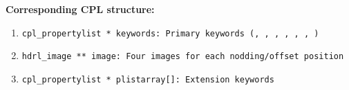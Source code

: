 \begin{datastructdef}
\textbf{Corresponding \ac{CPL} structure:}
\begin{enumerate}
    \item \texttt{cpl\_propertylist * keywords: Primary keywords (\hyperref[fits:dpr.catg]{},  \hyperref[fits:dpr.tech]{},  \hyperref[fits:dpr.type]{},  \hyperref[fits:ins.opti3.name]{},  \hyperref[fits:ins.opti9.name]{},  \hyperref[fits:ins.opti10.name]{}, \hyperref[fits:ins.opti11.name]{})}
    \item \texttt{hdrl\_image ** image: Four images for each nodding/offset position}
    \item \texttt{cpl\_propertylist * plistarray[]: Extension keywords}
\end{enumerate}
\end{datastructdef}


